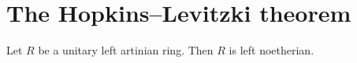 


\section{The Hopkins--Levitzki theorem}

\begin{theorem}
	\label{thm:Hopkins-Levitzki}
	Let $R$ be a unitary left artinian ring. Then $R$ is left noetherian.
\end{theorem}


